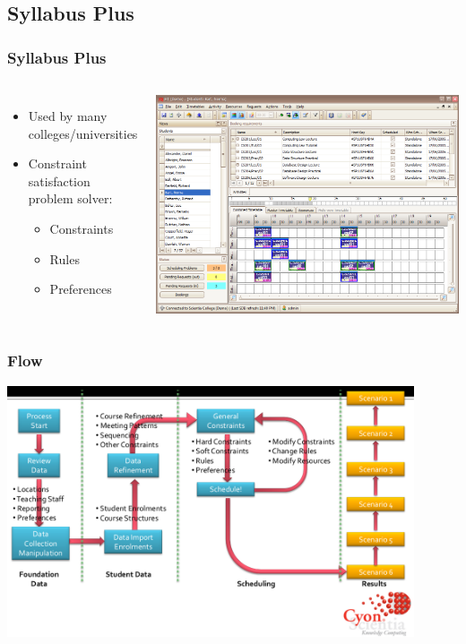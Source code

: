 \documentclass{beamer}
\begin{document}
\subsection{Syllabus Plus}
\begin{frame}
	\frametitle{Syllabus Plus}
	\begin{columns}%
    \begin{itemize}
		\item Used by many colleges/universities
		\item Constraint satisfaction problem solver:
		\begin{itemize}
			\item Constraints 
			\item Rules
			\item Preferences
		\end{itemize}
	\end{itemize}
    \includegraphics[width=\textwidth]{SyllabusPlus.png}
    \end{columns}	
\end{frame}

\begin{frame}
\frametitle{Flow}
\center
\includegraphics[width=0.9\textwidth]{SyllabusPlusFlow.png}
\end{frame}
\end{document}
